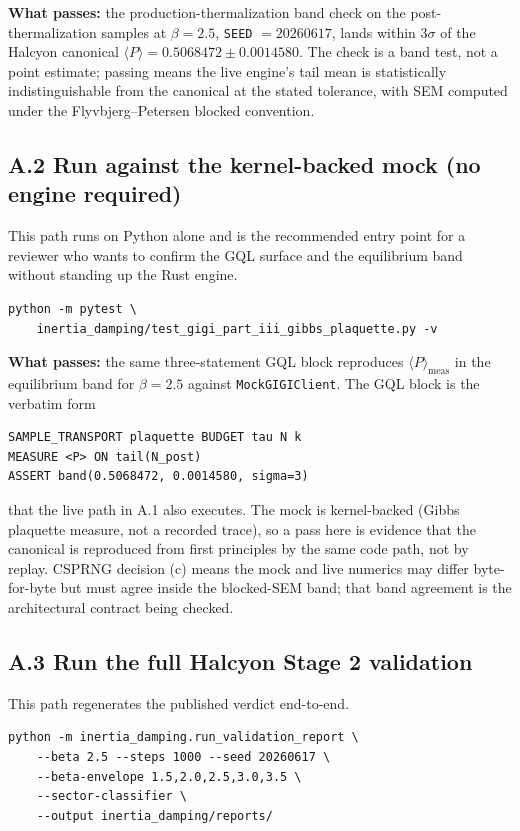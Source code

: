 \documentclass[12pt,a4paper]{article}
\theoremstyle{plain}
\theoremstyle{definition}
\theoremstyle{remark}
\begin{document}
\textbf{What passes:} the production-thermalization band check on the post-thermalization samples at $\beta = 2.5$, \texttt{SEED} $= 20260617$, lands within $3\sigma$ of the Halcyon canonical $\langle P \rangle = 0.5068472 \pm 0.0014580$. The check is a band test, not a point estimate; passing means the live engine's tail mean is statistically indistinguishable from the canonical at the stated tolerance, with SEM computed under the Flyvbjerg--Petersen blocked convention.

\subsection*{A.2 Run against the kernel-backed mock (no engine required)}

This path runs on Python alone and is the recommended entry point for a reviewer who wants to confirm the GQL surface and the equilibrium band without standing up the Rust engine.

\begin{verbatim}
python -m pytest \
    inertia_damping/test_gigi_part_iii_gibbs_plaquette.py -v
\end{verbatim}

\textbf{What passes:} the same three-statement GQL block reproduces $\langle P \rangle_{\mathrm{meas}}$ in the equilibrium band for $\beta = 2.5$ against \texttt{MockGIGIClient}. The GQL block is the verbatim form
\begin{verbatim}
SAMPLE_TRANSPORT plaquette BUDGET tau N k
MEASURE <P> ON tail(N_post)
ASSERT band(0.5068472, 0.0014580, sigma=3)
\end{verbatim}
that the live path in A.1 also executes. The mock is kernel-backed (Gibbs plaquette measure, not a recorded trace), so a pass here is evidence that the canonical is reproduced from first principles by the same code path, not by replay. CSPRNG decision (c) means the mock and live numerics may differ byte-for-byte but must agree inside the blocked-SEM band; that band agreement is the architectural contract being checked.

\subsection*{A.3 Run the full Halcyon Stage 2 validation}

This path regenerates the published verdict end-to-end.

\begin{verbatim}
python -m inertia_damping.run_validation_report \
    --beta 2.5 --steps 1000 --seed 20260617 \
    --beta-envelope 1.5,2.0,2.5,3.0,3.5 \
    --sector-classifier \
    --output inertia_damping/reports/
\end{verbatim}
\end{document}
